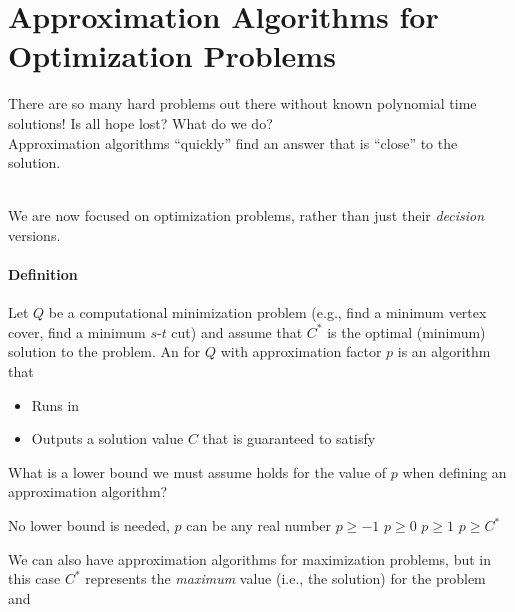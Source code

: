 \documentclass[11  pt]{article}
\begin{document}
	
	
	
	
	
	
	
	
	\section{Approximation Algorithms for Optimization Problems}
	There are so many hard problems out there without known polynomial time solutions! Is all hope lost? What do we do?\\
	
	Approximation algorithms ``quickly'' find an answer that is ``close'' to the solution. \\ \\
	
	\vs{3cm} 
	
	We are now focused on optimization problems, rather than just their \emph{decision} versions.
	\paragraph{Definition}
	Let $Q$ be a computational minimization problem (e.g., find a minimum vertex cover, find a minimum $s$-$t$ cut) and assume that $C^*$ is the optimal (minimum) solution to the problem. An  for $Q$ with approximation factor $p$ is an algorithm that 
	\begin{itemize}
		\item Runs in %
		\item Outputs a solution value $C$ that is guaranteed to satisfy %
	\end{itemize}
	
	\vfill
	
	\begin{Qu}
		What is a lower bound we must assume holds for the value of $p$ when defining an approximation algorithm?
		\begin{itemize}
			\aitem No lower bound is needed, $p$ can be any real number
			\bitem $ p \geq -1$
			\citem $p \geq 0$
			\ditem $p \geq 1$
			\eitem $p \geq C^*$
		\end{itemize}
	\end{Qu}
	\vs{1cm}
	
	We can also have approximation algorithms for maximization problems, but in this case $C^*$ represents the \emph{maximum} value (i.e., the solution) for the problem and  %
	
\end{document}
